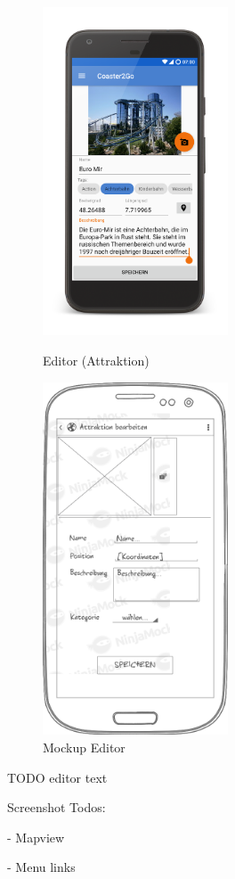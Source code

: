 \begin{figure}[h]
	\centering
	\begin{minipage}{0.49\textwidth}
		\centering
		\includegraphics[width=0.49\textwidth, trim=150 200 200 200, 
		clip]{img/screenshots/ss_attraktion_edit.png}
		\caption{Editor (Attraktion)}
		\label{figure:implementierungwartezeiten}
	\end{minipage}
	\begin{minipage}{0.49\textwidth}
		\centering
		\includegraphics[width=0.49\textwidth]{img/mockups/m_editor.png}
		\caption{Mockup Editor}
	\end{minipage}
\end{figure}

TODO editor text

Screenshot Todos:

- Mapview

- Menu links




















